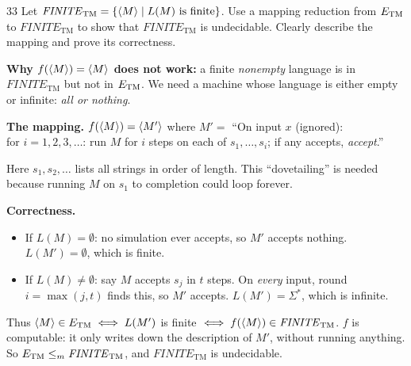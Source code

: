 \begin{question}{33}
Let $\mathit{FINITE}_{\mathrm{TM}}=\{\langle M\rangle\mid L(M) \text{ is finite}\}$. Use a mapping reduction from $E_{\mathrm{TM}}$ to $\mathit{FINITE}_{\mathrm{TM}}$ to show that $\mathit{FINITE}_{\mathrm{TM}}$ is undecidable. Clearly describe the mapping and prove its correctness.
\end{question}
\begin{soln}
\textbf{Why $f(\langle M\rangle)=\langle M\rangle$ does not work:} a finite \emph{nonempty} language is in $\mathit{FINITE}_{\mathrm{TM}}$ but not in $E_{\mathrm{TM}}$. We need a machine whose language is either empty or infinite: \emph{all or nothing}.

\textbf{The mapping.} $f(\langle M\rangle)=\langle M'\rangle$ where
$M'=$ ``On input $x$ (ignored):\\
\hspace*{1.5em}for $i=1,2,3,\dots$: run $M$ for $i$ steps on each of $s_1,\dots,s_i$; if any accepts, \emph{accept}.''


Here $s_1,s_2,\dots$ lists all strings in order of length. This ``dovetailing'' is needed because running $M$ on $s_1$ to completion could loop forever.

\textbf{Correctness.}
\begin{itemize}
\item If $L(M)=\emptyset$: no simulation ever accepts, so $M'$ accepts nothing. $L(M')=\emptyset$, which is finite.
\item If $L(M)\neq\emptyset$: say $M$ accepts $s_j$ in $t$ steps. On \emph{every} input, round $i=\max(j,t)$ finds this, so $M'$ accepts. $L(M')=\Sigma^*$, which is infinite.
\end{itemize}
Thus $\langle M\rangle\in E_{\mathrm{TM}}\iff L(M')$ is finite $\iff f(\langle M\rangle)\in\mathit{FINITE}_{\mathrm{TM}}$. $f$ is computable: it only writes down the description of $M'$, without running anything. So $E_{\mathrm{TM}}\le_{m}\mathit{FINITE}_{\mathrm{TM}}$, and $\mathit{FINITE}_{\mathrm{TM}}$ is undecidable.
\end{soln}

